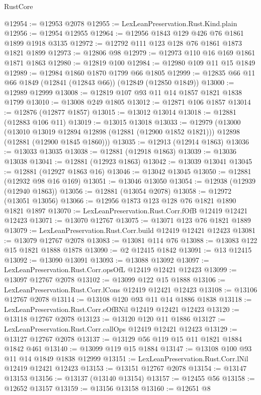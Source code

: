 \begin{lexlean}{RustCore}
\begin{coremodule}
@12954 := @12953 @2078
@12955 := LexLeanPreservation.Rust.Kind.plain
@12956 := @12954 @12955
@12964 := @12956 @1843 @129 @426 @76 @1861 @1899 @1918 @3135
@12972 := @12792 @111 @123 @128 @76 @1861 @1873 @1821 @1899
@12973 := @12806 @98
@12979 := @12973 @110 @16 @169 @1861 @1871 @1863
@12980 := @12819 @100
@12984 := @12980 @109 @11 @15 @1849
@12989 := @12984 @1860 @1870 @1799 @66 @1805
@12999 := @12835 @66 @11 @66 @1849 (@12841 (@12843 @66)) (@12849 (@12850 @1849))
@13000 := @12989 @12999
@13008 := @12819 @107 @93 @11 @14 @1857 @1821 @1838 @1799
@13010 := @13008 @249 @1805
@13012 := @12871 @106 @1857
@13014 := @12876 (@12877 @1857)
@13015 := @13012 @13014
@13018 := @12881 (@12883 @106 @11)
@13019 := @13015 @13018
@13033 := @12979
    (@13000
      (@13010 @13019 @12894 @12898 (@12881 (@12900 @1852 @1821)))
      @12898
      (@12881 (@12900 @1845 @1860)))
@13035 := @12913 (@12914 @1863)
@13036 := @13033 @13035
@13038 := @12881 (@12918 @1863)
@13039 := @13036 @13038
@13041 := @12881 (@12923 @1863)
@13042 := @13039 @13041
@13045 := @12881 (@12927 @1863 @16)
@13046 := @13042 @13045
@13050 := @12881 (@12932 @98 @16 @169)
@13051 := @13046 @13050
@13054 := @12938 (@12939 (@12940 @1863))
@13056 := @12881 (@13054 @2078)
@13058 := @12972 (@13051 @13056)
@13066 := @12956 @1873 @123 @128 @76 @1821 @1890 @1821 @1897
@13070 := LexLeanPreservation.Rust.Corr.fOfB @12419 @12421 @12423
@13071 := @13070 @12767
@13075 := @13071 @123 @76 @1821 @1889
@13079 := LexLeanPreservation.Rust.Corr.build @12419 @12421 @12423
@13081 := @13079 @12767 @2078
@13083 := @13081 @114 @76
@13088 := @13083 @122 @15 @1821 @1888 @1878
@13090 := @2 @12415 @1842
@13091 := @13 @12415
@13092 := @13090 @13091
@13093 := @13088 @13092
@13097 := LexLeanPreservation.Rust.Corr.opsOfL @12419 @12421 @12423
@13099 := @13097 @12767 @2078
@13102 := @13099 @122 @15 @1888
@13106 := LexLeanPreservation.Rust.Corr.lCons @12419 @12421 @12423
@13108 := @13106 @12767 @2078
@13114 := @13108 @120 @93 @11 @14 @1886 @1838
@13118 := LexLeanPreservation.Rust.Corr.eOfBNil @12419 @12421 @12423
@13120 := @13118 @12767 @2078
@13123 := @13120 @120 @11 @1886
@13127 := LexLeanPreservation.Rust.Corr.callOps @12419 @12421 @12423
@13129 := @13127 @12767 @2078
@13137 := @13129 @56 @119 @15 @11 @1821 @1884 @1842 @461
@13140 := @13099 @119 @15 @1884
@13147 := @13108 @100 @93 @11 @14 @1849 @1838 @12999
@13151 := LexLeanPreservation.Rust.Corr.lNil @12419 @12421 @12423
@13153 := @13151 @12767 @2078
@13154 := @13147 @13153
@13156 := @13137 (@13140 @13154)
@13157 := @12455 @56
@13158 := @12652 @13157
@13159 := @13156 @13158
@13160 := @12651 @8

\end{coremodule}
\end{lexlean}
